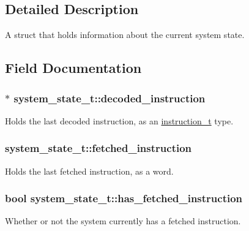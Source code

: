 \subsection{Detailed Description}
A struct that holds information about the current system state. 

\subsection{Field Documentation}
\subsubsection[{\texorpdfstring{decoded\+\_\+instruction}{decoded_instruction}}]{$\ast$ system\+\_\+state\+\_\+t\+::decoded\+\_\+instruction}\hypertarget{structsystem__state__t_ab53a970384d9c812a2a4c6e327b19a95}{}\label{structsystem__state__t_ab53a970384d9c812a2a4c6e327b19a95}
Holds the last decoded instruction, as an \hyperlink{structinstruction__t}{instruction\+\_\+t} type. 
\subsubsection[{\texorpdfstring{fetched\+\_\+instruction}{fetched_instruction}}]{ system\+\_\+state\+\_\+t\+::fetched\+\_\+instruction}\hypertarget{structsystem__state__t_a9cb73fc3980fae6ad4eff34e8461d947}{}\label{structsystem__state__t_a9cb73fc3980fae6ad4eff34e8461d947}
Holds the last fetched instruction, as a word. 
\subsubsection[{\texorpdfstring{has\+\_\+fetched\+\_\+instruction}{has_fetched_instruction}}]{\setlength{\rightskip}{0pt plus 5cm}bool system\+\_\+state\+\_\+t\+::has\+\_\+fetched\+\_\+instruction}\hypertarget{structsystem__state__t_afe188f4e4c4fed3fab882599cfdafa76}{}\label{structsystem__state__t_afe188f4e4c4fed3fab882599cfdafa76}
Whether or not the system currently has a fetched instruction. 
